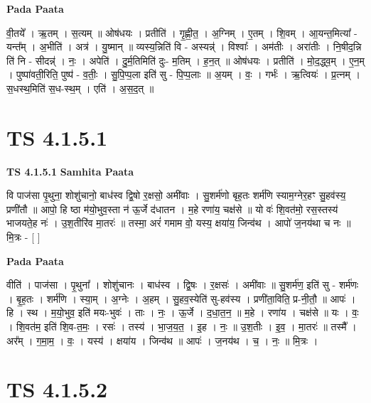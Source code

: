 \documentclass[17pt]{extarticle}
\begin{document}
\textbf{Pada Paata} \newline

वी॒तये᳚ । ऋ॒तम् । स॒त्यम् ॥ ओष॑धयः । प्रतीति॑ । गृ॒ह्णी॒त॒ । अ॒ग्निम् । ए॒तम् । शि॒वम् । आ॒यन्त॒मित्या᳚ - यन्त᳚म् । अ॒भीति॑ । अत्र॑ । यु॒ष्मान् ॥ व्यस्य॒न्निति॑ वि - अस्यन्न्॑ । विश्वाः᳚ । अम॑तीः । अरा॑तीः । नि॒षीद॒न्नि ति॑ नि - सीदन्न्॑ । नः॒ । अपेति॑ । दु॒र्म॒तिमिति॑ दुः- म॒तिम् । ह॒न॒त् ॥ ओष॑धयः । प्रतीति॑ । मो॒द॒द्ध्व॒म् । ए॒न॒म् । पुष्पा॑वती॒रिति॒ पुष्प॑ - व॒तीः॒ । सु॒पि॒प्प॒ला इति॑ सु - पि॒प्प॒लाः ॥ अ॒यम् । वः॒ । गर्भः॑ । ऋ॒त्वियः॑ । प्र॒त्नम् । स॒धस्थ॒मिति॑ स॒ध-स्थ॒म् । एति॑ । अ॒स॒द॒त् ॥  \newline





\section{ TS 4.1.5.1 }

\textbf{TS 4.1.5.1 } \newline
\textbf{Samhita Paata} \newline

वि पाज॑सा पृ॒थुना॒ शोशु॑चानो॒ बाध॑स्व द्वि॒षो र॒क्षसो॒ अमी॑वाः । सु॒शर्म॑णो बृह॒तः शर्म॑णि स्याम॒ग्नेर॒हꣳ सु॒हव॑स्य॒ प्रणी॑तौ ॥ आपो॒ हि ष्ठा म॑यो॒भुव॒स्ता न॑ ऊ॒र्जे द॑धातन । म॒हे रणा॑य॒ चक्ष॑से ॥ यो वः॑ शि॒वत॑मो॒ रस॒स्तस्य॑ भाजयते॒ह नः॑ । उ॒श॒तीरि॑व मा॒तरः॑ ॥ तस्मा॒ अरं॑ गमाम वो॒ यस्य॒ क्षया॑य॒ जिन्व॑थ । आपो॑ ज॒नय॑था च नः ॥ मि॒त्रः - [  ] \newline

\textbf{Pada Paata} \newline

वीति॑ । पाज॑सा । पृ॒थुना᳚ । शोशु॑चानः । बाध॑स्व । द्वि॒षः । र॒क्षसः॑ । अमी॑वाः ॥ सु॒शर्म॑ण॒ इति॑ सु - शर्म॑णः । बृ॒ह॒तः । शर्म॑णि । स्या॒म् । अ॒ग्नेः । अ॒हम् । सु॒हव॒स्येति॑ सु-हव॑स्य । प्रणी॑ता॒विति॒ प्र-नी॒तौ॒ ॥ आपः॑ । हि । स्थ । म॒यो॒भुव॒ इति॑ मयः-भुवः॑ । ताः । नः॒ । ऊ॒र्जे । द॒धा॒त॒न॒ ॥ म॒हे । रणा॑य । चक्ष॑से ॥ यः । वः॒ । शि॒वत॑म॒ इति॑ शि॒व-त॒मः॒ । रसः॑ । तस्य॑ । भा॒ज॒य॒त॒ । इ॒ह । नः॒ ॥ उ॒श॒तीः । इ॒व॒ । मा॒तरः॑ ॥ तस्मै᳚ । अर᳚म् । ग॒मा॒म॒ । वः॒ । यस्य॑ । क्षया॑य । जिन्व॑थ ॥ आपः॑ । ज॒नय॑थ । च॒ । नः॒ ॥ मि॒त्रः ।  \newline





\section{ TS 4.1.5.2 }
\end{document}
